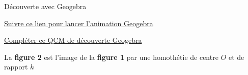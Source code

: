 \begin{activite}
    \partie[Découverte]
    \begin{myBox}{Découverte avec Geogebra}

        \vspace*{3mm}
        \href{https://www.geogebra.org/classic/wydhjpuc}{ Suivre ce lien pour lancer l'animation Geogebra}

        \vspace*{3mm}
        \href{https://www.geogebra.org/m/vaxxugnh}{ Compléter ce QCM de découverte Geogebra}

        \vspace*{3mm}
    \end{myBox}

    {\large
    }

    \og La \textbf{figure 2} est l'image de la \textbf{figure 1} par une homothétie de centre $O$ et de rapport $k$ \fg


\end{activite}
